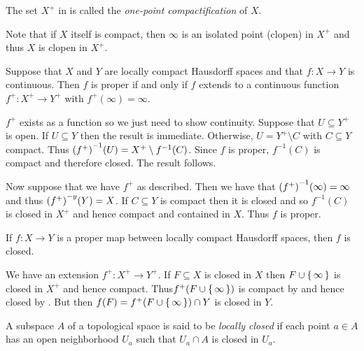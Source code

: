 \documentclass[letterpaper, 11pt, oneside]{book}
\begin{document}
\begin{defn}
  The set $X^{+}$ in  is called the \emph{one-point compactification} of $X$.
\end{defn}

Note that if $X$ itself is compact, then $\infty$ is an isolated point (clopen) in $X^{+}$ and thus $X$ is clopen in $X^{+}$.

\begin{thrm}
  Suppose that $X$ and $Y$ are locally compact Hausdorff spaces and that $f\colon X \to Y$ is continuous.
  Then $f$ is proper if and only if $f$ extends to a continuous function $f^{+}\colon X^{+} \to Y^{+}$ with $f^{+}(\infty) = \infty$.
\end{thrm}
\begin{pf}
  $f^{+}$ exists as a function so we just need to show continuity.
  Suppose that $U \subseteq Y^{+}$ is open.
  If $U \subseteq Y$ then the result is immediate.
  Otherwise, $U = Y^{+} \setminus C$ with $C \subseteq Y$ compact.
  Thus $\pqty{f^{+}}^{-1}(U) = X^{+} \setminus f^{-1}(C)$.
  Since $f$ is proper, $f^{-1}(C)$ is compact and therefore closed.
  The result follows.

  Now suppose that we have $f^{+}$ as described.
  Then we have that $\pqty{f^{+}}^{-1}(\infty) = \infty$ and thus $\pqty{f^{+}}^{-y}(Y) = X$.
  If $C \subseteq Y$ is compact then it is closed and so $f^{-1}(C)$ is closed in $X^{+}$ and hence compact and contained in $X$.
  Thus $f$ is proper.
\end{pf}

\begin{prop}
  If $f\colon X \to Y$ is a proper map between locally compact Hausdorff spaces, then $f$ is closed.
\end{prop}
\begin{pf}
  We have an extension $f^{+}\colon X^{+} \to Y^{+}$.
  If $F \subseteq X$ is closed in $X$ then $F \cup \set{\infty}$ is closed in $X^{+}$ and hence compact.
  Thus$ f^{+}(F \cup \set{\infty})$ is compact by  and hence closed by .
  But then $f(F) = f^{+}(F \cup \set{\infty}) \cap Y$ is closed in $Y$.
\end{pf}

\begin{defn}
  A subspace $A$ of a topological space is said to be \emph{locally closed} if each point $a \in A$ has an open neighborhood $U_{a}$ such that $U_{a} \cap A$ is closed in $U_{a}$.
\end{defn}
\end{document}
